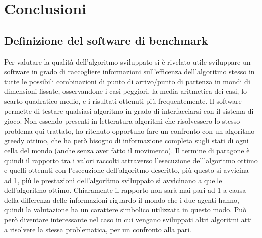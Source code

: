 \chapter{Conclusioni}
\section{Definizione del software di benchmark}
Per valutare la qualità dell'algoritmo sviluppato si è rivelato utile sviluppare un software in grado di raccogliere informazioni sull'efficenza dell'algoritmo stesso in tutte le possibili combinazioni di punto di arrivo/punto di partenza in mondi di dimensioni fissate, osservandone i casi peggiori, la media aritmetica dei casi, lo scarto quadratico medio, e i risultati ottenuti più frequentemente. Il software permette di testare qualsiasi algoritmo in grado di interfacciarsi con il sistema di gioco. Non essendo presenti in letteratura algoritmi che risolvessero lo stesso problema qui trattato, ho ritenuto opportuno fare un confronto con un algoritmo greedy ottimo, che ha però bisogno di informazione completa sugli stati di ogni cella del mondo (anche senza aver fatto il movimento). Il termine di paragone è quindi il rapporto tra i valori raccolti attraverso l'esecuzione dell'algoritmo ottimo e quelli ottenuti con l'esecuzione dell'algoritmo descritto, più questo si avvicina ad 1, più le prestazioni dell'algoritmo sviluppato si avvicinano a quelle dell'algoritmo ottimo. Chiaramente il rapporto non sarà mai pari ad 1 a causa della differenza delle informazioni riguardo il mondo che i due agenti hanno, quindi la valutazione ha un carattere simbolico utilizzata in questo modo. Può però diventare interessante nel caso in cui vengano sviluppati altri algoritmi atti a risolvere la stessa problematica, per un confronto alla pari.

